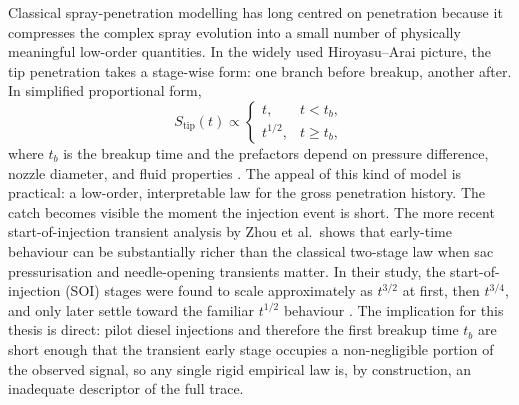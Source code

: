 \documentclass[english, 12pt, a4paper, elec, utf8, a-2b, online]{aaltothesis}
\begin{document}
Classical spray-penetration modelling has long centred on penetration because it compresses the complex spray evolution into a small number of physically meaningful low-order quantities.
In the widely used Hiroyasu--Arai picture, the tip penetration takes a stage-wise form: 
one branch before breakup, another after. In simplified proportional form,
\[
S_{\mathrm{tip}}(t)\propto
\begin{cases}
t, & t<t_b,\\
t^{1/2}, & t\ge t_b,
\end{cases}
\]
where \(t_b\) is the breakup time and the prefactors depend on pressure difference, nozzle diameter, and fluid properties \cite{HiroyasuArai1990}. 
The appeal of this kind of model is practical: a low-order, interpretable law for the gross penetration history. 
The catch becomes visible the moment the injection event is short. 
The more recent start-of-injection transient analysis by Zhou et al.\ 
shows that early-time behaviour can be substantially richer than the classical two-stage law when sac pressurisation and needle-opening transients matter. 
In their study, the start-of-injection (SOI) stages were found to scale approximately as \(t^{3/2}\) at first, then \(t^{3/4}\), 
and only later settle toward the familiar \(t^{1/2}\) behaviour \cite{ZhouLiYi2021}. 
The implication for this thesis is direct: 
pilot diesel injections and therefore the first breakup time \(t_b\) are short enough that the transient early stage occupies a non-negligible portion of the observed signal, 
so any single rigid empirical law is, by construction, an inadequate descriptor of the full trace.
\end{document}
